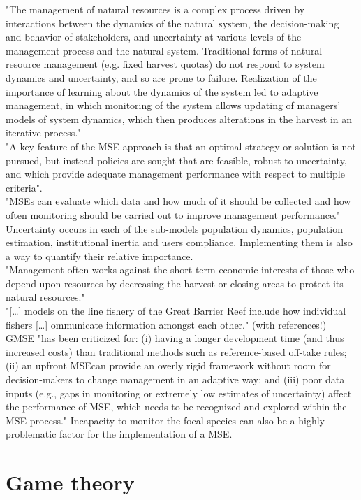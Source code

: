 \documentclass[12pt]{article}
\begin{document}
"The management of natural resources is a complex process driven by interactions between the dynamics of the natural system, the decision-making and behavior of stakeholders, and uncertainty at various levels of the management process and the natural system. Traditional forms of natural resource management (e.g. fixed harvest quotas) do not respond to system dynamics and uncertainty, and so are prone to failure. Realization of the importance of learning about the dynamics of the system led to adaptive management, in which monitoring of the system allows updating of managers’ models of system dynamics, which then produces alterations in the harvest in an iterative process."\\
"A key feature of the MSE approach is that an optimal strategy or solution is not pursued, but instead policies are sought that are feasible, robust to uncertainty, and which provide adequate management performance with respect to multiple criteria".\\
"MSEs can evaluate which data and how much of it should be collected and how often monitoring should be carried out to improve management performance."\\
Uncertainty occurs in each of the sub-models population dynamics, population estimation, institutional inertia and users compliance. Implementing them is also a way to quantify their relative importance.\\
"Management often works against the short-term economic interests of those who depend upon resources by decreasing the harvest or closing areas to protect its natural resources."\\
"[\dots] models on the line fishery of the Great Barrier Reef include how individual fishers [\dots] ommunicate
information amongst each other." (with references!)\\
GMSE "has been criticized for: (i) having a longer development time (and thus increased costs) than traditional methods such as reference-based off-take rules; (ii) an upfront MSEcan provide an overly rigid framework without room for decision-makers to change management in an adaptive way; and (iii) poor data inputs (e.g., gaps in monitoring or extremely low estimates of uncertainty) affect the performance of MSE, which needs to be recognized and explored within the MSE process." Incapacity to monitor the focal species can also be a highly problematic factor for the implementation of a MSE.

\section{Game theory}
\end{document}
